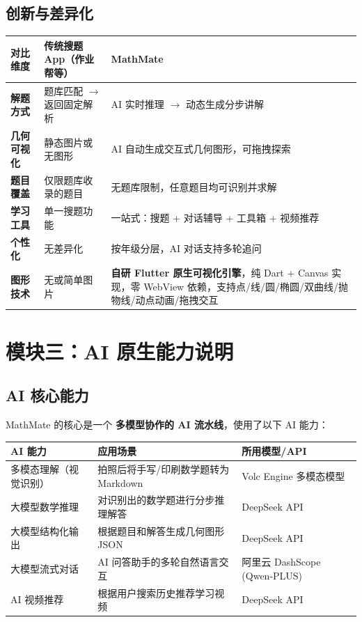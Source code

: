 \documentclass[12pt, a4paper]{ctexart}
\begin{document}
\subsection{创新与差异化}
\begin{center}
\begin{tabular}{|p{2cm}|p{5cm}|p{5cm}|}
\hline
\textbf{对比维度} & \textbf{传统搜题 App（作业帮等）} & \textbf{MathMate} \\ \hline
\textbf{解题方式} & 题库匹配 $\rightarrow$ 返回固定解析 & AI 实时推理 $\rightarrow$ 动态生成分步讲解 \\ \hline
\textbf{几何可视化} & 静态图片或无图形 & AI 自动生成交互式几何图形，可拖拽探索 \\ \hline
\textbf{题目覆盖} & 仅限题库收录的题目 & 无题库限制，任意题目均可识别并求解 \\ \hline
\textbf{学习工具} & 单一搜题功能 & 一站式：搜题 + 对话辅导 + 工具箱 + 视频推荐 \\ \hline
\textbf{个性化} & 无差异化 & 按年级分层，AI 对话支持多轮追问 \\ \hline
\textbf{图形技术} & 无或简单图片 & \textbf{自研 Flutter 原生可视化引擎}，纯 Dart + Canvas 实现，零 WebView 依赖，支持点/线/圆/椭圆/双曲线/抛物线/动点动画/拖拽交互 \\ \hline
\end{tabular}
\end{center}

\section{模块三：AI 原生能力说明}

\subsection{AI 核心能力}
MathMate 的核心是一个 \textbf{多模型协作的 AI 流水线}，使用了以下 AI 能力：
\begin{center}
\begin{tabular}{|p{4cm}|p{4cm}|p{4cm}|}
\hline
\textbf{AI 能力} & \textbf{应用场景} & \textbf{所用模型/API} \\ \hline
多模态理解（视觉识别） & 拍照后将手写/印刷数学题转为 Markdown & Volc Engine 多模态模型 \\ \hline
大模型数学推理 & 对识别出的数学题进行分步推理解答 & DeepSeek API \\ \hline
大模型结构化输出 & 根据题目和解答生成几何图形 JSON & DeepSeek API \\ \hline
大模型流式对话 & AI 问答助手的多轮自然语言交互 & 阿里云 DashScope (Qwen-PLUS) \\ \hline
AI 视频推荐 & 根据用户搜索历史推荐学习视频 & DeepSeek API \\ \hline
\end{tabular}
\end{center}
\end{document}
